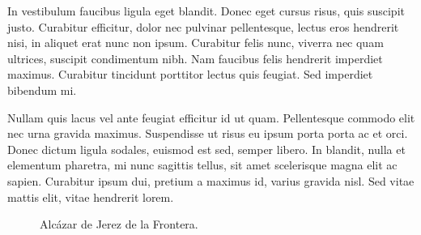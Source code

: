 In vestibulum faucibus ligula eget blandit. Donec eget cursus risus, quis suscipit justo. Curabitur efficitur, dolor nec pulvinar pellentesque, lectus eros hendrerit nisi, in aliquet erat nunc non ipsum. Curabitur felis nunc, viverra nec quam ultrices, suscipit condimentum nibh. Nam faucibus felis hendrerit imperdiet maximus. Curabitur tincidunt porttitor lectus quis feugiat. Sed imperdiet bibendum mi.

Nullam quis lacus vel ante feugiat efficitur id ut quam. Pellentesque commodo elit nec urna gravida maximus. Suspendisse ut risus eu ipsum porta porta ac et orci. Donec dictum ligula sodales, euismod est sed, semper libero. In blandit, nulla et elementum pharetra, mi nunc sagittis tellus, sit amet scelerisque magna elit ac sapien. Curabitur ipsum dui, pretium a maximus id, varius gravida nisl. Sed vitae mattis elit, vitae hendrerit lorem. 


\begin{figure}
    \centering
    \hfill
    
    \caption{Alcázar de Jerez de la Frontera.}
    \label{fig:cha1:jerez}
\end{figure}


